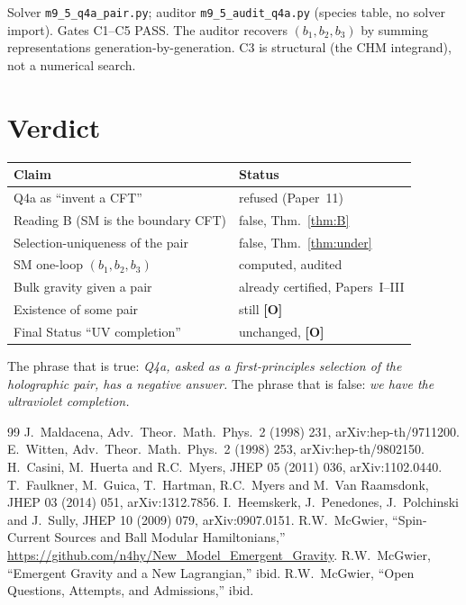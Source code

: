\documentclass[11pt]{article}
\theoremstyle{definition}
\newcommand{\pO}{\textbf{[O]}}
\begin{document}
Solver \texttt{m9\_5\_q4a\_pair.py}; auditor
\texttt{m9\_5\_audit\_q4a.py} (species table, no solver import).
Gates C1--C5 PASS. The auditor recovers $(b_1,b_2,b_3)$ by summing
representations generation-by-generation. C3 is structural (the
CHM integrand), not a numerical search.

\section{Verdict}

\begin{center}
\begin{tabular}{@{}p{}p{}@{}}
\toprule
Claim & Status \\
\midrule
Q4a as ``invent a CFT'' & refused (Paper~11) \\
Reading B (SM is the boundary CFT) & false, Thm.~\ref{thm:B} \\
Selection-uniqueness of the pair & false, Thm.~\ref{thm:under} \\
SM one-loop $(b_1,b_2,b_3)$ & computed, audited \\
Bulk gravity given a pair & already certified, Papers~I--III \\
Existence of some pair & still \pO{} \\
Final Status ``UV completion'' & unchanged, \pO{} \\
\bottomrule
\end{tabular}
\end{center}

The phrase that is true: \emph{Q4a, asked as a first-principles
selection of the holographic pair, has a negative answer.}
The phrase that is false: \emph{we have the ultraviolet completion.}

\begin{thebibliography}{99}
J.~Maldacena,
Adv.\ Theor.\ Math.\ Phys.\ 2 (1998) 231, arXiv:hep-th/9711200.
E.~Witten,
Adv.\ Theor.\ Math.\ Phys.\ 2 (1998) 253, arXiv:hep-th/9802150.
H.~Casini, M.~Huerta and R.C.~Myers,
JHEP 05 (2011) 036, arXiv:1102.0440.
T.~Faulkner, M.~Guica, T.~Hartman, R.C.~Myers and M.~Van Raamsdonk,
JHEP 03 (2014) 051, arXiv:1312.7856.
I.~Heemskerk, J.~Penedones, J.~Polchinski and J.~Sully,
JHEP 10 (2009) 079, arXiv:0907.0151.
R.W.~McGwier,
``Spin-Current Sources and Ball Modular Hamiltonians,''
\url{https://github.com/n4hy/New_Model_Emergent_Gravity}.
R.W.~McGwier,
``Emergent Gravity and a New Lagrangian,'' ibid.
R.W.~McGwier,
``Open Questions, Attempts, and Admissions,'' ibid.
\end{thebibliography}
\end{document}
